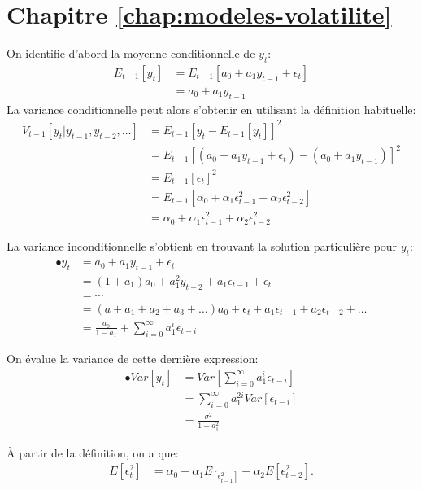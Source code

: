 \section*{Chapitre \ref{chap:modeles-volatilite}}

\begin{solution}{3.1}
  On identifie d'abord la moyenne conditionnelle de $y_t$:
\begin{align}
E_{t-1}[y_t] &= E_{t-1}[a_0 + a_1 y_{t-1} + \epsilon_t] \\
&= a_0 + a_1 y_{t-1}
\end{align}
La variance conditionnelle peut alors s'obtenir en utilisant la définition habituelle:
\begin{align*}
V_{t-1}[y_t | y_{t-1}, y_{t-2}, \ldots] &= E_{t-1}[y_t - E_{t-1}[y_t]]^{2} \\
&= E_{t-1}[(a_0 + a_1 y_{t-1} + \epsilon_t)-(a_0 + a_1 y_{t-1})]^{2} \\
&= E_{t-1}[\epsilon_t]^{2} \\
&= E_{t-1}[\alpha_0 + \alpha_1\epsilon_{t-1}^2 + \alpha_2\epsilon_{t-2}^2] \\
&= \alpha_0 + \alpha_1\epsilon_{t-1}^2 + \alpha_2\epsilon_{t-2}^2
\end{align*}

La variance inconditionnelle s'obtient en trouvant la solution particulière pour $y_t$:
\begin{align*}
•y_t &= a_0 + a_1 y_{t-1} + \epsilon_t \\
&= (1+a_1)a_0 + a_1^2 y_{t-2} + a_1 \epsilon_{t-1} + \epsilon_t \\
&= \cdots \\
&= (a+a_1+a_2+a_3+\ldots)a_0 + \epsilon_t + a_1\epsilon_{t-1} + a_2\epsilon_{t-2} + \ldots \\
&= \frac{a_0}{1-a_1} + \sum_{i=0}^{\infty} a_1^{i}\epsilon_{t-i}
\end{align*}

On évalue la variance de cette dernière expression:
\begin{align*}
•Var[y_t] &= Var[\sum_{i=0}^{\infty} a_1^{i}\epsilon_{t-i}] \\
&= \sum_{i=0}^{\infty} a_1^{2i} Var[\epsilon_{t-i}] \\
&= \frac{\sigma^2}{1-a_1^2}
\end{align*}

À partir de la définition, on a que:
\begin{align*}
E[\epsilon_t^2] &= \alpha_0 + \alpha_1 E_[\epsilon_{t-1}^2] + \alpha_2 E[\epsilon_{t-2}^2].
\end{align*}


\end{solution}
